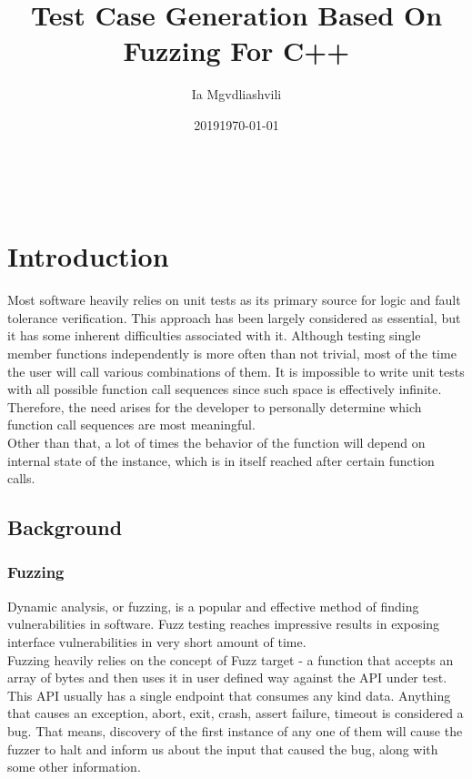 \documentclass{elteikthesis}[2018/06/06]
\date{2019}
\affiliation{Associate Professor, PhD}
\author{Ia Mgvdliashvili}
\date{\today}
\title{Test Case Generation Based On Fuzzing For C++}
\begin{document}
\maketitle
\setcounter{page}{1} \\
\setcounter{tocdepth}{0}
\tableofcontents

\chapter{Introduction}
\label{sec-1}
Most software heavily relies on unit tests as its primary source for logic and fault tolerance verification. This approach has been largely considered as essential, but it has some inherent difficulties associated with it. Although testing single member functions independently is more often than not trivial, most of the time the user will call various combinations of them. It is impossible to write unit tests with all possible function call sequences since such space is effectively infinite. Therefore, the need arises for the developer to personally determine which function call sequences are most meaningful. \\

Other than that, a lot of times the behavior of the function will depend on internal state of the instance, which is in itself reached after certain function calls. \\
\section{Background}
\label{sec-1-1}
\subsection{Fuzzing}
\label{sec-1-1-1}
Dynamic analysis, or fuzzing, is a popular and effective method of finding vulnerabilities in software. Fuzz testing reaches impressive results in exposing interface vulnerabilities in very short amount of time. \\

Fuzzing heavily relies on the concept of Fuzz target - a function that accepts an array of bytes and then uses it in user defined way against the API under test. This API usually has a single endpoint that consumes any kind data. Anything that causes an exception, abort, exit, crash, assert failure, timeout is considered a bug\cite{libfuzzerpresentation}. That means, discovery of the first instance of any one of them will cause the fuzzer to halt and inform us about the input that caused the bug, along with some other information. \\
\end{document}
